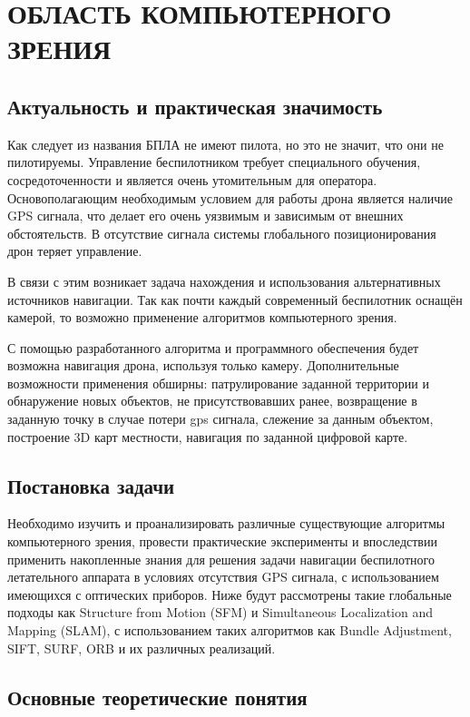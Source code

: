 \chapter{ОБЛАСТЬ КОМПЬЮТЕРНОГО ЗРЕНИЯ}

\section{Актуальность и практическая значимость}

Как следует из названия БПЛА не имеют пилота, но это не значит, что они не пилотируемы. Управление беспилотником требует специального обучения, сосредоточенности и является очень утомительным для оператора. Основополагающим необходимым условием для работы дрона является наличие GPS сигнала, что делает его очень уязвимым и зависимым от внешних обстоятельств. В отсутствие сигнала системы глобального позиционирования дрон теряет управление.

В связи с этим возникает задача нахождения и использования альтернативных источников навигации. Так как почти каждый современный беспилотник оснащён камерой, то возможно применение алгоритмов компьютерного зрения.

С помощью разработанного алгоритма и программного обеспечения будет возможна навигация дрона, используя только камеру. Дополнительные возможности применения обширны: патрулирование заданной территории и обнаружение новых объектов, не присутствовавших ранее, возвращение в заданную точку в случае потери gps сигнала, слежение за данным объектом, построение 3D карт местности, навигация по заданной цифровой карте.

\section{Постановка задачи}

Необходимо изучить и проанализировать различные существующие алгоритмы компьютерного зрения, провести практические эксперименты и впоследствии применить накопленные знания для решения задачи навигации беспилотного летательного аппарата в условиях отсутствия GPS сигнала, с использованием имеющихся с оптических приборов. Ниже будут рассмотрены такие глобальные подходы как Structure from Motion (SFM) и Simultaneous Localization and Mapping (SLAM), с использованием таких алгоритмов как Bundle Adjustment, SIFT, SURF, ORB и их различных реализаций.

\section{Основные теоретические понятия}

